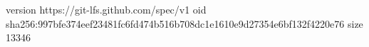 version https://git-lfs.github.com/spec/v1
oid sha256:997bfe374eef23481fc6fd474b516b708dc1e1610e9d27354e6bf132f4220e76
size 13346
